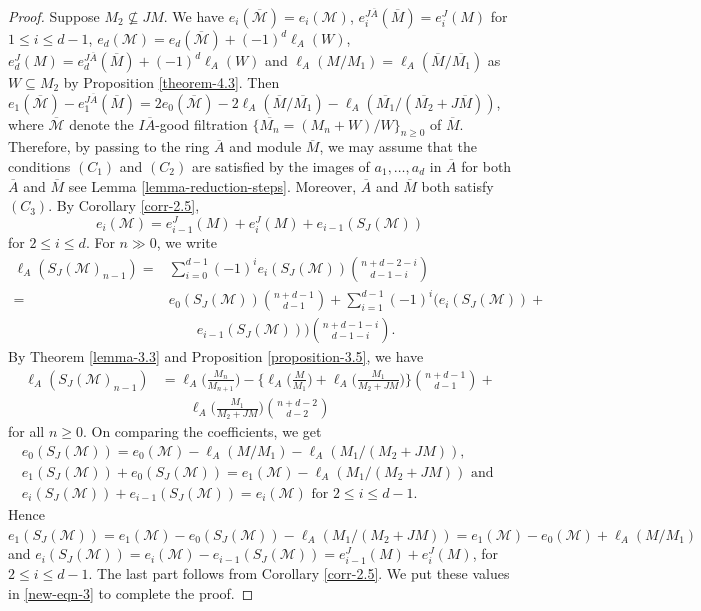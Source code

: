 \documentclass[11pt,reqno]{amsart}
\theoremstyle{definition}
\def\M{{\mathcal M}}
\numberwithin{equation}{section}
\begin{document}
\begin{proof}
	Suppose $M_2\nsubseteq JM.$ We have $e_i(\overline{\M})=e_i(\M)$, $e_i^{J\overline{A}}(\overline{M})=e_i^J(M)$ for $1\leq i\leq d-1$, $e_d(\M)=e_d(\overline{\M})+(-1)^d\ell_A(W)$, $e_d^J(M)=e_d^{J\overline{A}}(\overline{M})+(-1)^d\ell_A(W)$ 
	and $\ell_A(M/M_1)=\ell_A(\overline{M}/\overline{M_1})$ as $W\subseteq M_2$ by Proposition \ref{theorem-4.3}. Then  $e_1(\overline{\M})-e_1^{J\overline{A}}(\overline{M})=2e_0(\overline{\M})-2\ell_A(\overline{M}/\overline{M_1} )-\ell_A(\overline{M_1} /(\overline{M_2}+J\overline{M}))$, where $\overline{\M}$ denote the $I\overline{A}$-good filtration $\{ \overline{M_n}=(M_n+W)/W\}_{n\geq 0}$ of $\overline{M}$.
	 Therefore, by passing to the ring $\overline{A}$ and module $\overline{M}$, we may assume that the conditions $(C_1)$ and $(C_2)$ are satisfied by the images of $a_1,\ldots,a_d$ in $\overline{A}$ for both $\overline{A}$ and $\overline{M}$ see Lemma \ref{lemma-reduction-steps}. Moreover, $\overline{A}$ and $\overline{M}$ both satisfy $(C_3)$. By Corollary \ref{corr-2.5}, 
\begin{equation}\label{new-eqn-3}
	e_i(\M)=e_{i-1}^J(M)+e_i^J(M)+e_{i-1}(S_J(\M))
\end{equation}
	for $2\leq i\leq d.$  For $n\gg 0$, we write 
		\begin{align*}
		\ell_A(S_J(\M)_{n-1})=&\mathop\sum\limits_{i=0}^{d-1}(-1)^i e_i(S_J(\M))\binom{n+d-2-i}{d-1-i}\\
		=&e_0(S_J(\M))\binom{n+d-1}{d-1}+\mathop\sum\limits_{i=1}^{d-1}(-1)^i(e_i(S_J(\M))+\\&\qquad e_{i-1}(S_J(\M)))\binom{n+d-1-i}{d-1-i}.
	\end{align*}
	By Theorem \ref{lemma-3.3} and Proposition \ref{proposition-3.5}, we have 
	\begin{align*}
		\ell_A(S_J(\M)_{n-1})&= \ell_A\Big(\frac{M_n}{M_{n+1}}\Big)-\Big\{\ell_A\Big(\frac{M}{M_1}\Big)+\ell_A\Big(\frac{M_1}{M_2+JM}\Big)\Big\}\binom{n+d-1}{d-1}
		 + \\
         &\qquad \ell_A\Big(\frac{M_1}{M_2+JM}\Big)\binom{n+d-2}{d-2}
	\end{align*}
	for all $n\geq 0.$ On comparing the coefficients, we get 
	\begin{align*}
		e_0(S_J(\M))=e_0(\M)-\ell_A(M/M_1)-\ell_A(M_1/(M_2+JM)),\\
		e_1(S_J(\M))+e_0(S_J(\M))=e_1(\M)-\ell_A(M_1/(M_2+JM)) \text{ and }\\
		e_i(S_J(\M))+e_{i-1}(S_J(\M))=e_i(\M) \mbox{ for } 2\leq i\leq d-1.
	\end{align*}
Hence $e_1(S_J(\M))=e_1(\M)-e_0(S_J(\M))-\ell_A(M_1/(M_2+JM))=e_1(\M)-e_0(\M)+\ell_A(M/M_1)$ and  $e_i(S_J(\M))=e_i(\M)-e_{i-1}(S_J(\M))=e_{i-1}^J(M)+e_i^J(M)$,	for $2\leq i\leq d-1$. The last part follows from  Corollary \ref{corr-2.5}. We put these values in \eqref{new-eqn-3} to complete the proof.
\end{proof}
\end{document}
